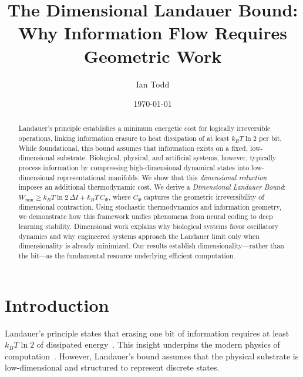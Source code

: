 \documentclass[aps,prx,twocolumn,superscriptaddress,floatfix]{revtex4-2}
\begin{document}
\title{The Dimensional Landauer Bound: Why Information Flow Requires Geometric Work}

\author{Ian Todd}

\date{\today}

\begin{abstract}
Landauer's principle establishes a minimum energetic cost for logically irreversible operations, linking information erasure to heat dissipation of at least $k_B T \ln 2$ per bit. While foundational, this bound assumes that information exists on a fixed, low-dimensional substrate. Biological, physical, and artificial systems, however, typically process information by compressing high-dimensional dynamical states into low-dimensional representational manifolds. We show that this \emph{dimensional reduction} imposes an additional thermodynamic cost. We derive a \emph{Dimensional Landauer Bound}: $W_{\min} \ge k_B T \ln 2\, \Delta I + k_B T\, C_\Phi$, where $C_\Phi$ captures the geometric irreversibility of dimensional contraction. Using stochastic thermodynamics and information geometry, we demonstrate how this framework unifies phenomena from neural coding to deep learning stability. Dimensional work explains why biological systems favor oscillatory dynamics and why engineered systems approach the Landauer limit only when dimensionality is already minimized. Our results establish dimensionality---rather than the bit---as the fundamental resource underlying efficient computation.
\end{abstract}

\maketitle

\section{Introduction}

Landauer's principle states that erasing one bit of information requires at least $k_B T \ln 2$ of dissipated energy~\cite{landauer1961,berut2012}. This insight underpins the modern physics of computation~\cite{bennett1982,parrondo2015}. However, Landauer's bound assumes that the physical substrate is low-dimensional and structured to represent discrete states.
\end{document}
